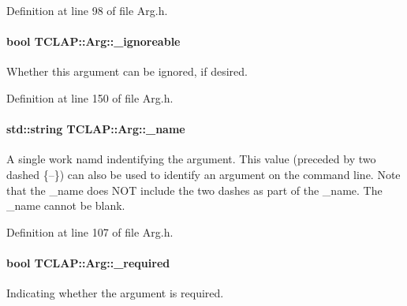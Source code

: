 Definition at line 98 of file Arg.\+h.

\paragraph[{\texorpdfstring{\+\_\+ignoreable}{_ignoreable}}]{\setlength{\rightskip}{0pt plus 5cm}bool T\+C\+L\+A\+P\+::\+Arg\+::\+\_\+ignoreable\hspace{0.3cm}{\ttfamily [protected]}}\hypertarget{classTCLAP_1_1Arg_a9832bb7564f4ab472bd51b7b1bbc683f}{}\label{classTCLAP_1_1Arg_a9832bb7564f4ab472bd51b7b1bbc683f}
Whether this argument can be ignored, if desired. 

Definition at line 150 of file Arg.\+h.

\paragraph[{\texorpdfstring{\+\_\+name}{_name}}]{\setlength{\rightskip}{0pt plus 5cm}std\+::string T\+C\+L\+A\+P\+::\+Arg\+::\+\_\+name\hspace{0.3cm}{\ttfamily [protected]}}\hypertarget{classTCLAP_1_1Arg_ac0f138057a99fb5d94ff4acb41a083aa}{}\label{classTCLAP_1_1Arg_ac0f138057a99fb5d94ff4acb41a083aa}
A single work namd indentifying the argument. This value (preceded by two dashed \{--\}) can also be used to identify an argument on the command line. Note that the \+\_\+name does N\+OT include the two dashes as part of the \+\_\+name. The \+\_\+name cannot be blank. 

Definition at line 107 of file Arg.\+h.

\paragraph[{\texorpdfstring{\+\_\+required}{_required}}]{\setlength{\rightskip}{0pt plus 5cm}bool T\+C\+L\+A\+P\+::\+Arg\+::\+\_\+required\hspace{0.3cm}{\ttfamily [protected]}}\hypertarget{classTCLAP_1_1Arg_ad16408bd1ca4d8b1d14d6c5129545a84}{}\label{classTCLAP_1_1Arg_ad16408bd1ca4d8b1d14d6c5129545a84}
Indicating whether the argument is required. 


